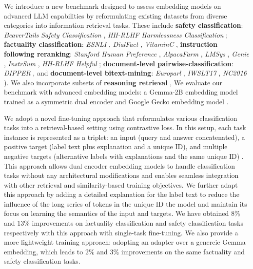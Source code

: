 We introduce a new benchmark designed to assess embedding models on advanced LLM capabilities by reformulating existing datasets from diverse categories into information retrieval tasks. These include \textbf{safety classification}: \textit{BeaverTails Safety Classification} \citep{ji2023beavertails}, \textit{HH-RLHF Harmlessness Classification} \citep{bai-etal-2022-hhrlhf}; \textbf{factuality classification}:  \textit{ESNLI} \citep{camburu-etal-2018-esnli}, \textit{DialFact} \citep{gupta-etal-2022-dialfact}, \textit{VitaminC} \citep{schuster-etal-2021-vitaminc}, \textbf{instruction following reranking}: \textit{Stanford Human Preference} \citep{pmlr-v162-shp}, \textit{AlpacaFarm} \citep{dubois-etal-2023-alpacafarm}, \textit{LMSys} \citep{chiang-etal-2024-chatbot}, \textit{Genie} \citep{khashabi-etal-2022-genie}, \textit{InstrSum} \citep{ji2023beavertails}, \textit{HH-RLHF Helpful} \citep{bai-etal-2022-hhrlhf};  \textbf{document-level pairwise-classification}: \textit{DIPPER} \citep{dipper}, and \textbf{document-level bitext-mining}: \textit{Europarl} \citep{koehn-2005-europarl}, \textit{IWSLT17} \citep{cettolo-etal-iwslt17-overview}, \textit{NC2016} \citep{maruf-etal-2019-selective}). We also incorporate subsets of \textbf{reasoning retrieval} \citep{xiao2024rarbreasoningretrievalbenchmark},  We evaluate our benchmark with advanced embedding models: a Gemma-2B \citep{gemmateam2024gemmaopenmodelsbased} embedding model trained as a symmetric dual encoder \citep{neelakantan2022}
and Google Gecko embedding model \citep{lee2024geckoversatiletextembeddings}.



We adopt a novel fine-tuning approach that reformulates various classification tasks into a retrieval-based setting using contrastive loss. In this setup, each task instance is represented as a triplet: an input (query and answer concatenated), a positive target (label text plus explanation and a unique ID), and multiple negative targets (alternative labels with explanations and the same unique ID) \citep{lee2024geckoversatiletextembeddings}. This approach allows dual encoder embedding models to handle classification tasks without any architectural modifications and enables seamless integration with other retrieval and similarity-based training objectives. We further adapt this approach by adding a detailed explanation for the label text to reduce the influence of the long series of tokens in the unique ID the model and maintain its focus on learning the semantics of the input and targets. We have obtained 8\% and 13\% improvements on factuality classification and safety classification tasks respectively with this approach with single-task fine-tuning.  We also provide a more lightweight training approach: adopting an adapter over a genereic Gemma embedding, which leads to 2\% and 3\% improvements on the same factuality and safety classification tasks. 

